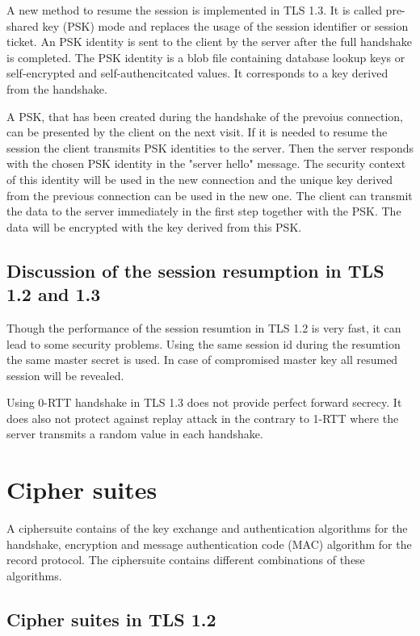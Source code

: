 A new method to resume the session is implemented in TLS 1.3. It is called pre-shared key (PSK) mode and replaces the usage of the session identifier or session ticket. An PSK identity is sent to the client by the server after the full handshake is completed. The PSK identity is a blob file containing database lookup keys or self-encrypted and self-authencitcated values. It corresponds to a key derived from the handshake.

A PSK, that has been created during the handshake of the prevoius connection, can be presented by the client on the next visit. If it is needed to resume the session the client transmits PSK identities to the server. Then the server responds with the chosen PSK identity in the "server hello" message. The security context of this identity will be used in the new connection and the unique key derived from the previous connection can be used in the new one. 
The client can transmit the data to the server immediately in the first step together with the PSK. The data will be encrypted with the key derived from this PSK.\cite{ldapwiki:resumption}

\subsection{Discussion of the session resumption in TLS 1.2 and 1.3}
\label{subsec:discussion_resumption}

Though the performance of the session resumtion in TLS 1.2 is very fast, it can lead to some security problems. Using the same session id during the resumtion the same master secret is used. In case of compromised master key all resumed session will be revealed.

Using 0-RTT handshake in TLS 1.3 does not provide perfect forward secrecy. It does also not protect against replay attack in the contrary to 1-RTT where the server transmits a random value in each handshake.


\section{Cipher suites}
\label{sec:comparison_ciphersuits}

A ciphersuite contains of the key exchange and authentication algorithms for the handshake, encryption and message authentication code (MAC) algorithm for the record protocol. The ciphersuite contains different combinations of these algorithms.

\subsection{Cipher suites in TLS 1.2}
\label{subsec:ciphersuits1_2}

